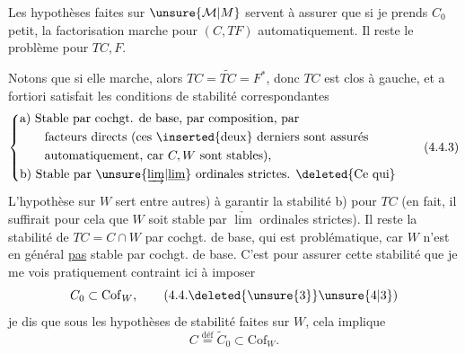 
Les hypothèses  faites  sur $\unsure{\mathcal M|M}$  servent
à assurer que si je prends $C_0$ petit,  la
factorisation marche pour $(C,TF)$ automatiquement. Il reste le problème pour
$TC,F$.

Notons que si elle marche, alors $TC=\widetilde{TC}=F^*$,
donc $TC$ est clos à gauche, et a fortiori
satisfait les conditions de stabilité correspondantes
\[
\left\{\begin{aligned}
&\text{a) Stable par cochgt. de base, par composition, par}\\
&\qquad\text{facteurs directs (ces \inserted{deux} derniers sont assurés}\\
&\qquad\text{automatiquement, car $C,W$ sont stables),}\\
&\text{b) Stable par $\unsure{\underrightarrow{\lim}|\underline{\lim}}$ ordinales strictes. \deleted{Ce qui}}
\end{aligned}\right. \tag*{(4.4.3)}
\]
 L'hypothèse  sur $W$ sert \unsure{(}entre autres) à garantir
 la stabilité b) pour $TC$ (en fait, il
suffirait pour cela  que $W$ soit stable par
$\underrightarrow{\lim}$ ordinales strictes). Il reste la stabilité
de $TC=C\cap W$ par cochgt. de base, qui
est problématique, car $W$ n'est en général
\uline{pas} stable par cochgt. de base. C'est pour
assurer cette stabilité que je me vois
pratiquement contraint ici à imposer
\[
 C_0\subset\mathrm{Cof}_W,\tag*{(4.4.\deleted{\unsure{3}}\unsure{4|3})}
\]
je dis que sous les hypothèses de stabilité
faites sur $W$, cela implique
\[
 C\overset{\mathrm{déf}}{=}\widetilde C_0\subset\mathrm{Cof}_W.\tag*{(4.4.5)}
\]

